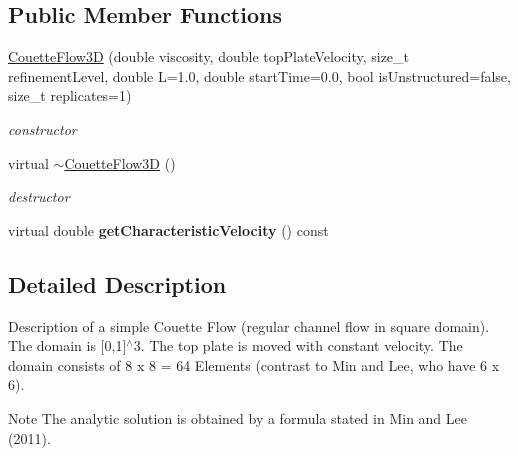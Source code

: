 \subsection*{Public Member Functions}
\begin{DoxyCompactItemize}
\item 
\hyperlink{classnatrium_1_1CouetteFlow3D_a8b290b81061a030b5984377c48b3f2cc}{CouetteFlow3D} (double viscosity, double topPlateVelocity, size\_\-t refinementLevel, double L=1.0, double startTime=0.0, bool isUnstructured=false, size\_\-t replicates=1)
\begin{DoxyCompactList}\small\item\em constructor \item\end{DoxyCompactList}\item 
\hypertarget{classnatrium_1_1CouetteFlow3D_a2d1b9db247ba3e51ed092dab3637a657}{
virtual \hyperlink{classnatrium_1_1CouetteFlow3D_a2d1b9db247ba3e51ed092dab3637a657}{$\sim$CouetteFlow3D} ()}
\label{classnatrium_1_1CouetteFlow3D_a2d1b9db247ba3e51ed092dab3637a657}

\begin{DoxyCompactList}\small\item\em destructor \item\end{DoxyCompactList}\item 
\hypertarget{classnatrium_1_1CouetteFlow3D_a38cc986a0f45a5ec7ef56fefc9e342df}{
virtual double {\bfseries getCharacteristicVelocity} () const }
\label{classnatrium_1_1CouetteFlow3D_a38cc986a0f45a5ec7ef56fefc9e342df}

\end{DoxyCompactItemize}


\subsection{Detailed Description}
Description of a simple Couette Flow (regular channel flow in square domain). The domain is \mbox{[}0,1\mbox{]}$^\wedge$3. The top plate is moved with constant velocity. The domain consists of 8 x 8 = 64 Elements (contrast to Min and Lee, who have 6 x 6). \begin{DoxyNote}{Note}
The analytic solution is obtained by a formula stated in Min and Lee (2011). 
\end{DoxyNote}


